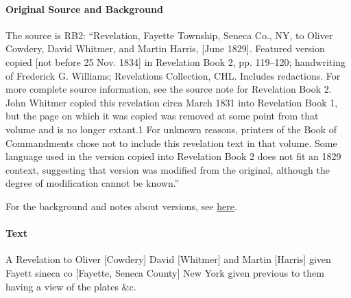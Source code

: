 			\paragraph{Original Source and Background}
			
				The source is RB2: ``Revelation, Fayette Township, Seneca Co., NY, to Oliver Cowdery, David Whitmer, and Martin Harris, [June 1829]. Featured version copied [not before 25 Nov. 1834] in Revelation Book 2, pp. 119--120; handwriting of Frederick G. Williams; Revelations Collection, CHL. Includes redactions. For more complete source information, see the source note for Revelation Book 2. John Whitmer copied this revelation circa March 1831 into Revelation Book 1, but the page on which it was copied was removed at some point from that volume and is no longer extant.1 For unknown reasons, printers of the Book of Commandments chose not to include this revelation text in that volume. Some language used in the version copied into Revelation Book 2 does not fit an 1829 context, suggesting that version was modified from the original, although the degree of modification cannot be known.''
				
				For the background and notes about versions, see \hyperref[DC17-HB]{here}.
			
			\paragraph{Text}
			
				A Revelation to Oliver [Cowdery] David [Whitmer] and Martin [Harris] given Fayett sineca co [Fayette, Seneca County] New York given previous to them having a view of the plates \&c.
				
